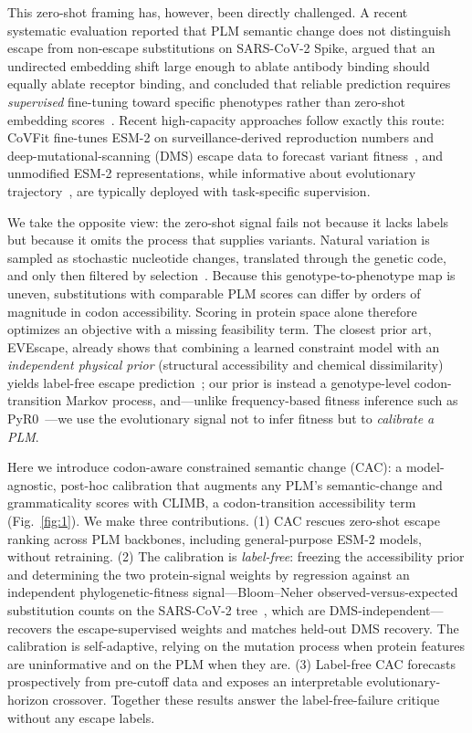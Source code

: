 \documentclass[11pt]{article}
\begin{document}
This zero-shot framing has, however, been directly challenged. A recent systematic evaluation reported that PLM semantic change does not distinguish escape from non-escape substitutions on SARS-CoV-2 Spike, argued that an undirected embedding shift large enough to ablate antibody binding should equally ablate receptor binding, and concluded that reliable prediction requires \emph{supervised} fine-tuning toward specific phenotypes rather than zero-shot embedding scores~\cite{allman2025systematic}. Recent high-capacity approaches follow exactly this route: CoVFit fine-tunes ESM-2 on surveillance-derived reproduction numbers and deep-mutational-scanning (DMS) escape data to forecast variant fitness~\cite{covfit2025}, and unmodified ESM-2 representations, while informative about evolutionary trajectory~\cite{lamb2026esm}, are typically deployed with task-specific supervision.

We take the opposite view: the zero-shot signal fails not because it lacks labels but because it omits the process that supplies variants. Natural variation is sampled as stochastic nucleotide changes, translated through the genetic code, and only then filtered by selection~\cite{Halpern1998,Rodrigue2010}. Because this genotype-to-phenotype map is uneven, substitutions with comparable PLM scores can differ by orders of magnitude in codon accessibility. Scoring in protein space alone therefore optimizes an objective with a missing feasibility term. The closest prior art, EVEscape, already shows that combining a learned constraint model with an \emph{independent physical prior} (structural accessibility and chemical dissimilarity) yields label-free escape prediction~\cite{thadani2023evescape}; our prior is instead a genotype-level codon-transition Markov process, and---unlike frequency-based fitness inference such as PyR0~\cite{obermeyer2022analysis}---we use the evolutionary signal not to infer fitness but to \emph{calibrate a PLM}.

Here we introduce codon-aware constrained semantic change (CAC): a model-agnostic, post-hoc calibration that augments any PLM's semantic-change and grammaticality scores with CLIMB, a codon-transition accessibility term (Fig.~\ref{fig:1}). We make three contributions. (1) CAC rescues zero-shot escape ranking across PLM backbones, including general-purpose ESM-2 models, without retraining. (2) The calibration is \emph{label-free}: freezing the accessibility prior and determining the two protein-signal weights by regression against an independent phylogenetic-fitness signal---Bloom--Neher observed-versus-expected substitution counts on the SARS-CoV-2 tree~\cite{bloom2023fitness}, which are DMS-independent---recovers the escape-supervised weights and matches held-out DMS recovery. The calibration is self-adaptive, relying on the mutation process when protein features are uninformative and on the PLM when they are. (3) Label-free CAC forecasts prospectively from pre-cutoff data and exposes an interpretable evolutionary-horizon crossover. Together these results answer the label-free-failure critique~\cite{allman2025systematic} without any escape labels.
\end{document}
